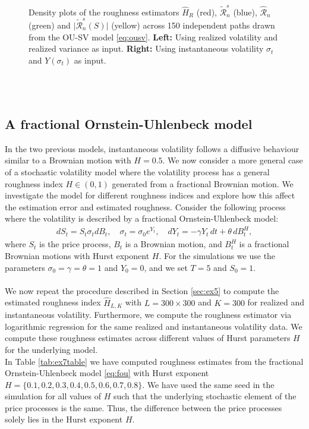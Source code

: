 \documentclass{article}
\begin{document}
\begin{figure}[htbp]
    \caption{Density plots of the roughness estimators $\widehat{H}_R$ (red), $\widetilde{\mathscr{R}}_n^s$ (blue), $\widehat{\mathscr{R}}_n$ (green) and $\lvert \widetilde{\mathscr{R}}_n^s (S)\rvert$ (yellow) across 150 independent paths drawn from the OU-SV model \eqref{eq:ousv}. \textbf{Left:} Using realized volatility and realized variance as input. \textbf{Right:} Using instantaneous volatility $\sigma_t$ and $Y(\sigma_t)$ as input.}
    \label{fig:ex6dens}
\end{figure}\\\\
\subsection{A fractional Ornstein-Uhlenbeck model}
In the two previous models, instantaneous volatility follows a diffusive behaviour similar to a Brownian motion with $H=0.5$. We now consider a more general case of a stochastic volatility model where the volatility process has a general roughness index $H\in(0,1)$ generated from a fractional Brownian motion. We investigate the model for different roughness indices and explore how this affect the estimation error and estimated roughness. Consider the following process where the volatility is described by a fractional Ornstein-Uhlenbeck model:
\begin{align}
dS_t = S_t \sigma_t dB_t, \quad \sigma_t = \sigma_0 e^{Y_t}, \quad dY_t = -\gamma Y_t \, dt + \theta \, dB^H_t, \label{eq:fou}
\end{align}
where $S_t$ is the price process, $B_t$ is a Brownian motion, and $B_t^H$ is a fractional Brownian motions with Hurst exponent $H$. For the simulations we use the parameters $\sigma_0 =\gamma=\theta=1$ and $Y_0=0$, and we set $T=5$ and $S_0=1$.\\\\
We now repeat the procedure described in Section \ref{sec:ex5} to compute the estimated roughness index $\widehat{H}_{L,K}$ with $L=300\times 300$ and $K=300$ for realized and instantaneous volatility. Furthermore, we compute the roughness estimator via logarithmic regression for the same realized and instantaneous volatility data. We compute these roughness estimates across different values of Hurst parameters $H$ for the underlying model. \\
In Table \ref{tab:ex7table} we have computed roughness estimates from the fractional Ornstein-Uhlenbeck model \eqref{eq:fou} with Hurst exponent $H=\{0.1,0.2,0.3,0.4,0.5,0.6,0.7,0.8\}$. We have used the same seed in the simulation for all values of $H$ such that the underlying stochastic element of the price processes is the same. Thus, the difference between the price processes solely lies in the Hurst exponent $H$.
\end{document}
